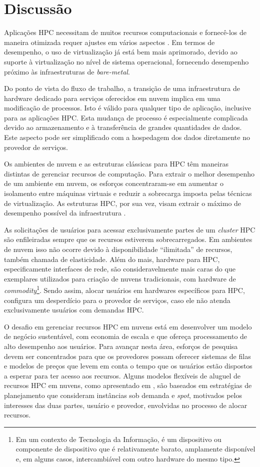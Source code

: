 \documentclass[tese,capa]{texufpel}
\begin{document}
\section{Discussão}\label{sec:discussao}

Aplicações HPC necessitam de muitos recursos computacionais e fornecê-los de maneira otimizada requer ajustes em vários aspectos \cite{GantikowReichKnahletal.2015}. Em termos de desempenho, o uso de virtualização já está bem mais aprimorado, devido ao suporte à virtualização no nível de sistema operacional, fornecendo desempenho próximo às infraestruturas de \textit{bare-metal}.

Do ponto de vista do fluxo de trabalho, a transição de uma infraestrutura de hardware dedicado para serviços oferecidos em nuvem implica em uma modificação de processos. Isto é válido para qualquer tipo de aplicação, inclusive para as aplicações HPC. Esta mudança de processo é especialmente complicada devido ao armazenamento e à transferência de grandes quantidades de dados. Este aspecto pode ser simplificado com a hospedagem dos dados diretamente no provedor de serviços.

Os ambientes de nuvem e as estruturas clássicas para HPC têm maneiras distintas de gerenciar recursos de computação. Para extrair o melhor desempenho de um ambiente em nuvem, os esforços concentraram-se em aumentar o isolamento entre máquinas virtuais e reduzir a sobrecarga imposta pelas técnicas de virtualização. As estruturas HPC, por sua vez, visam extrair o máximo de desempenho possível da infraestrutura \cite{netto_hpc_2018}. 

As solicitações de usuários para acessar exclusivamente partes de um \textit{cluster} HPC são enfileiradas sempre que os recursos estiverem sobrecarregados. Em ambientes de nuvem isso não ocorre devido à disponibilidade ``ilimitada'' de recursos, também chamada de elasticidade. Além do mais, hardware para HPC, especificamente interfaces de rede, são consideravelmente mais caras do que exemplares utilizados para criação de nuvens tradicionais, com hardware de \textit{commodity}\footnote{Em um contexto de Tecnologia da Informação, é um dispositivo ou componente de dispositivo que é relativamente barato, amplamente disponível e, em alguns casos, intercambiável com outro hardware do mesmo tipo.}. Sendo assim, alocar usuários em hardwares específicos para HPC, configura um desperdício para o provedor de serviços, caso ele não atenda exclusivamente usuários com demandas HPC.

O desafio em gerenciar recursos HPC em nuvens está em desenvolver um modelo de negócio sustentável, com economia de escala e que ofereça processamento de alto desempenho aos usuários. Para avançar nesta área, esforços de pesquisa devem ser concentrados para que os provedores possam oferecer sistemas de filas e modelos de preços que levem em conta o tempo que os usuários estão dispostos a esperar para ter acesso aos recursos. Alguns modelos flexíveis de aluguel de recursos HPC em nuvens, como apresentado em \cite{zhaoDesigningFlexibleResource2012e}, são baseados em estratégias de planejamento que consideram instâncias sob demanda e \textit{spot}, motivados pelos interesses das duas partes, usuário e provedor, envolvidas no processo de alocar recursos.
\end{document}
